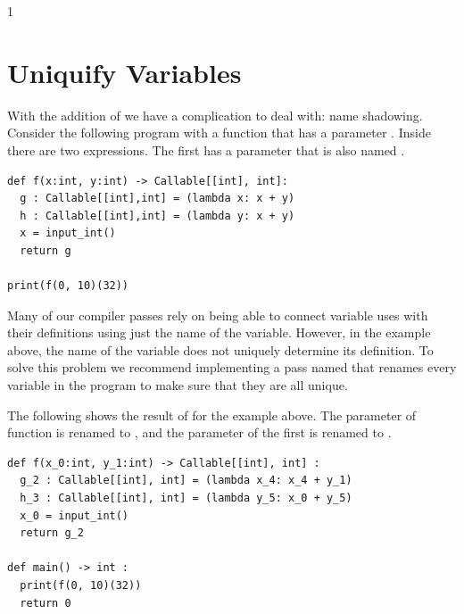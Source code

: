 \documentclass[7x10]{TimesAPriori_MIT}%
\def\racketEd{0}
\def\pythonEd{1}
\providecommand{\BookEdition}{1}
\let\edition\BookEdition
\newcommand{\racket}[1]{{\if\edition\racketEd{#1}\fi}}
\newcommand{\pythonColor}[0]{}
\newcommand{\python}[1]{{\if\edition\pythonEd\pythonColor #1\fi}}
\numberwithin{theorem}{chapter}
\numberwithin{definition}{chapter}
\numberwithin{equation}{chapter}
\begin{document}
{\if\edition\pythonEd\pythonColor
\section{Uniquify Variables}
\label{sec:uniquify-lambda}

With the addition of  we have a complication to deal
with: name shadowing. Consider the following program with a function
 that has a parameter . Inside  there are two
 expressions. The first  has a parameter
that is also named .

\begin{lstlisting}
def f(x:int, y:int) -> Callable[[int], int]:
  g : Callable[[int],int] = (lambda x: x + y)
  h : Callable[[int],int] = (lambda y: x + y)
  x = input_int()
  return g

print(f(0, 10)(32))
\end{lstlisting}

Many of our compiler passes rely on being able to connect variable
uses with their definitions using just the name of the
variable. However, in the example above, the name of the variable does
not uniquely determine its definition. To solve this problem we
recommend implementing a pass named  that renames every
variable in the program to make sure that they are all unique.

The following shows the result of  for the example
above. The  parameter of function  is renamed to
, and the  parameter of the first  is
renamed to .

\begin{lstlisting}
def f(x_0:int, y_1:int) -> Callable[[int], int] :
  g_2 : Callable[[int], int] = (lambda x_4: x_4 + y_1)
  h_3 : Callable[[int], int] = (lambda y_5: x_0 + y_5)
  x_0 = input_int()
  return g_2

def main() -> int :
  print(f(0, 10)(32))
  return 0
\end{lstlisting}

\fi} %


\end{document}
